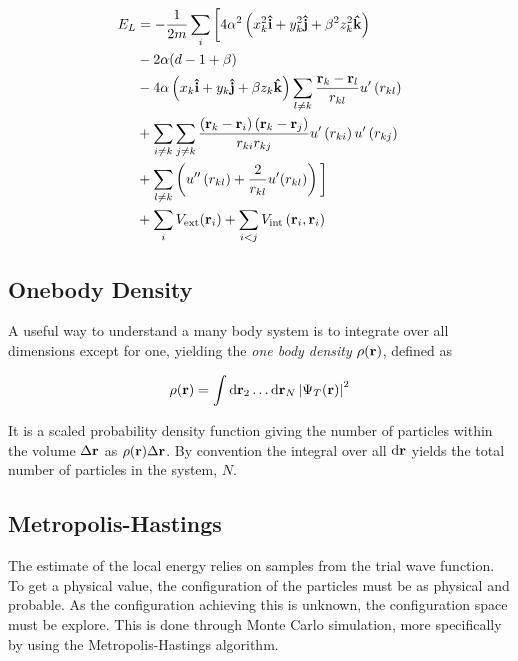 \begin{align*}
  E_{L} &= -\frac{1}{2m}\sum_{i}\bigg[4\alpha^{2}\left(  x_{k}^{2}\uvec{i} + y_{k}^{2}\uvec{j} + \beta^{2} z_{k}^{2}\uvec{k}  \right)\\
        &-2\alpha(d-1+\beta)\\
        &- 4\alpha\left(  x_{k}\uvec{i} + y_{k}\uvec{j} + \beta z_{k}\uvec{k}  \right)
          \sum_{l\neq k} \frac{\vb{r}_{k}-\vb{r}_{l}}{r_{kl}}u^{\prime}\left( r_{kl} \right)\\
        &+ \sum_{i\neq k}\sum_{j\neq k}\frac{\left( \vb{r}_{k}-\vb{r}_{i} \right)\left( \vb{r}_{k} -\vb{r}_{j} \right)}{r_{ki}r_{kj}}u^{\prime}\left( r_{ki} \right)u^{\prime}\left( r_{kj} \right)\\
        &+ \sum_{l\neq k} \left( u^{\prime\prime}\left( r_{kl} \right)  + \frac{2}{r_{kl}}u^{\prime}(r_{kl})\right)\bigg]\\
        &+ \sum_{i}V_{\text{ext}}(\vb{r}_{i}) + \sum_{i<j}V_{\text{int}}\left( \vb{r}_{i}, \vb{r}_{i} \right)
\end{align*}





\subsection{Onebody Density}

A useful way to understand a many body system is to integrate over all
dimensions except for one, yielding the \textit{one body density}
\(\rho(\vb{r})\), defined as

\begin{align*}
  \rho( \vb{r} ) = \int \dd \mathbf{r}_{2} \ldots \dd \mathbf{r}_{N} \left| \Psi_T(\vb{r}) \right|^{2}
\end{align*}

It is a scaled probability density function giving the number of particles
within the volume \(\Delta \vb{r}\) as \(\rho(\vb{r})\Delta \vb{r}\).
By convention the integral over all \(\dd \vb{r}\) yields the total number of
particles in the system, \(N\).

\subsection{Metropolis-Hastings}

The estimate of the local energy relies on samples from the trial wave function.
To get a physical value, the configuration of the particles must be as physical
and probable. As the configuration achieving this is unknown, the configuration
space must be explore. This is done through Monte Carlo simulation, more
specifically by using the Metropolis-Hastings algorithm.

